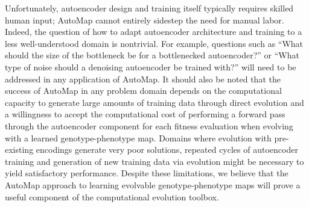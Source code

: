 Unfortunately, autoencoder design and training itself typically requires skilled human input; AutoMap cannot entirely sidestep the need for manual labor.
Indeed, the question of how to adapt autoencoder architecture and training to a less well-understood domain is nontrivial.
For example, questions such as ``What should the size of the bottleneck be for a bottlenecked autoencoder?'' or ``What type of noise should a denoising autoencoder be trained with?'' will need to be addressed in any application of AutoMap.
It should also be noted that the success of AutoMap in any problem domain depends on the computational capacity to generate large amounts of training data through direct evolution and a willingness to accept the computational cost of performing a forward pass through the autoencoder component for each fitness evaluation when evolving with a learned genotype-phenotype map.
Domains where evolution with pre-existing encodings generate very poor solutions, repeated cycles of autoencoder training and generation of new training data via evolution might be necessary to yield satisfactory performance.
Despite these limitations, we believe that the AutoMap approach to learning evolvable genotype-phenotype maps will prove a useful component of the computational evolution toolbox.

